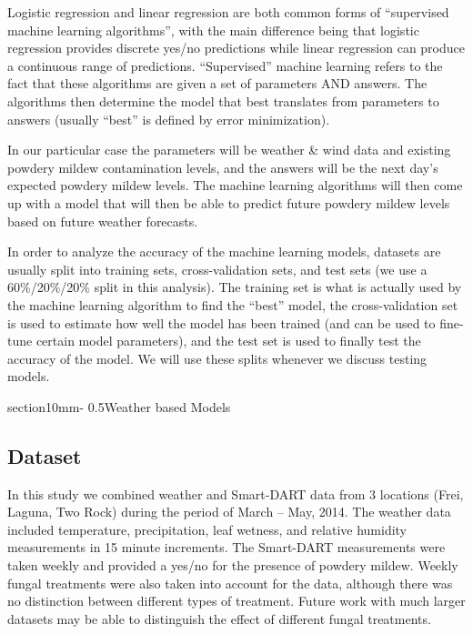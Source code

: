 \documentclass[letterpaper,12pt]{article}
\makeatletter
\renewcommand{\section}{\@startsection%
{section}{1}{0mm}{-\baselineskip}%
{0.5\baselineskip}{\normalfont\Large\bfseries}}%
\makeatother
\begin{document}
Logistic regression and linear regression are both common forms of ``supervised machine learning algorithms'', with the main difference being that logistic regression provides discrete yes/no predictions while linear regression can produce a continuous range of predictions.  ``Supervised'' machine learning refers to the fact that these algorithms are given a set of parameters AND answers. The algorithms then determine the model that best translates from parameters to answers (usually ``best'' is defined by error minimization). 

In our particular case the parameters will be weather \& wind data and existing powdery mildew contamination levels, and the answers will be the next day's expected powdery mildew levels. The machine learning algorithms will then come up with a model that will then be able to predict future powdery mildew levels based on future weather forecasts. 

In order to analyze the accuracy of the machine learning models, datasets are usually split into training sets, cross-validation sets, and test sets (we use a 60\%/20\%/20\% split in this analysis). The training set is what is actually used by the machine learning algorithm to find the ``best'' model, the cross-validation set is used to estimate how well the model has been trained (and can be used to fine-tune certain model parameters), and the test set is used to finally test the accuracy of the model. We will use these splits whenever we discuss testing models. 

\section{Weather based Models}\label{sec:data_mod}

\subsection{Dataset}

In this study we combined weather and Smart-DART data from 3 locations (Frei, Laguna, Two Rock) during the period of March -- May, 2014.  The weather data included temperature, precipitation, leaf wetness, and relative humidity measurements in 15 minute increments. The Smart-DART measurements were taken weekly and provided a yes/no for the presence of powdery mildew. Weekly fungal treatments were also taken into account for the data, although there was no distinction between different types of treatment.  Future work with much larger datasets may be able to distinguish the effect of different fungal treatments.   
\end{document}
